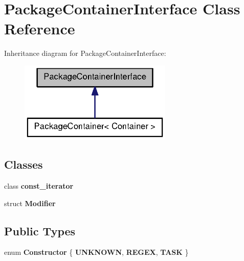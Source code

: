 \section{\-Package\-Container\-Interface \-Class \-Reference}
\label{classAPT_1_1PackageContainerInterface}


\-Inheritance diagram for \-Package\-Container\-Interface\-:
\nopagebreak
\begin{figure}[H]
\begin{center}
\leavevmode
\includegraphics[width=206pt]{classAPT_1_1PackageContainerInterface__inherit__graph}
\end{center}
\end{figure}
\subsection*{\-Classes}
\begin{DoxyCompactItemize}
\item 
class {\bf const\-\_\-iterator}
\item 
struct {\bf \-Modifier}
\end{DoxyCompactItemize}
\subsection*{\-Public \-Types}
\begin{DoxyCompactItemize}
\item 
enum {\bfseries \-Constructor} \{ {\bfseries \-U\-N\-K\-N\-O\-W\-N}, 
{\bfseries \-R\-E\-G\-E\-X}, 
{\bfseries \-T\-A\-S\-K}
 \}
\end{DoxyCompactItemize}
